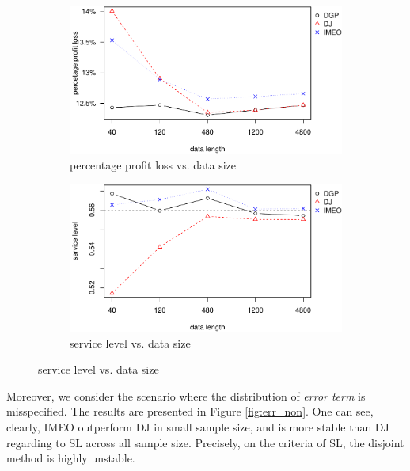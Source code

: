 \documentclass{article}
\begin{document}
\begin{figure}[ht]
\centering
\caption{Performance vs. smaple size with over-paramaterised nonlinear model}
\begin{subfigure}[b]{0.48\textwidth}
\centering
\includegraphics[width=\textwidth]{information_non-plot_files/figure-latex/SAR(3)(1)_4ppl-1.pdf}
\caption{percentage profit loss vs. data size}
\end{subfigure}
\hfill
\begin{subfigure}[b]{0.48\textwidth}
\centering
\includegraphics[width=\textwidth]{information_non-plot_files/figure-latex/SAR(3)(1)_4sl-1.pdf}
\caption{service level vs. data size}
\end{subfigure}
\label{fig:misnon_over}
\end{figure}

Moreover, we consider the scenario where the distribution of \emph{error term} is misspecified. The results are presented in Figure \ref{fig:err_non}. One can see, clearly, IMEO outperform DJ in small sample size, and is more stable than DJ regarding to SL across all sample size. Precisely, on the criteria of SL, the disjoint method is highly unstable.
\end{document}
